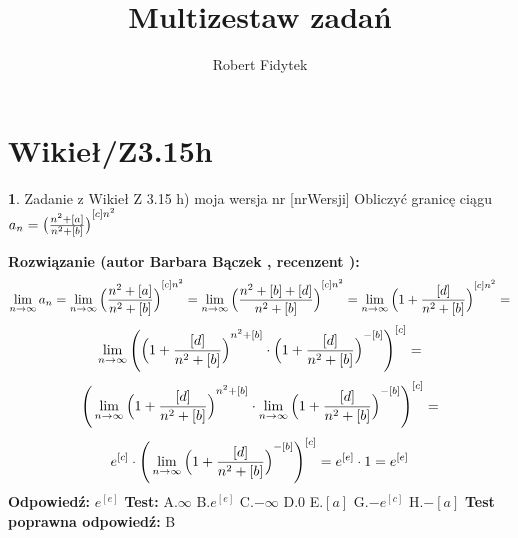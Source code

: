 \documentclass[12pt, a4paper]{article}
\title{Multizestaw zadań}
\author{Robert Fidytek}
\date{}
\theoremstyle{definition} %
\newtheorem{zad}{}
\newcommand{\kategoria}[1]{\section{#1}} %
\newcommand{\zadStart}[1]{\begin{zad}#1\newline} %
\newcommand{\zadStop}{\end{zad}}   %
\newcommand{\rozwStart}[2]{\noindent \textbf{Rozwiązanie (autor #1 , recenzent #2): }\newline} %
\newcommand{\rozwStop}{\newline}                                            %
\newcommand{\odpStart}{\noindent \textbf{Odpowiedź:}\newline}    %
\newcommand{\odpStop}{\newline}                                             %
\newcommand{\testStart}{\noindent \textbf{Test:}\newline} %
\newcommand{\testStop}{\newline} %
\newcommand{\kluczStart}{\noindent \textbf{Test poprawna odpowiedź:}\newline} %
\newcommand{\kluczStop}{\newline} %
\begin{document}
\maketitle


\kategoria{Wikieł/Z3.15h}
\zadStart{Zadanie z Wikieł Z 3.15 h) moja wersja nr [nrWersji]}
Obliczyć granicę ciągu $a_n= {\big{(} \frac{n^2+[a]}{n^2+[b]} \big{)}}^{[c]n^2}$
\zadStop
\rozwStart{Barbara Bączek}{}
$$\lim_{n \rightarrow \infty} a_n= \lim_{n \rightarrow \infty}  {\Big{(} \frac{n^2+[a]}{n^2+[b]} \Big{)}}^{[c]n^2}=\lim_{n \rightarrow \infty}  {\Big{(} \frac{n^2+[b]+[d]}{n^2+[b]} \Big{)}}^{[c]n^2}=\lim_{n \rightarrow \infty}  {\Big{(} 1+ \frac{[d]}{n^2+[b]} \Big{)}}^{[c]n^2}=$$
$$\lim_{n \rightarrow \infty} { \Bigg{(} {\Big{(} 1+ \frac{[d]}{n^2+[b]} \Big{)}}^{n^2+[b]} \cdot {\Big{(} 1+ \frac{[d]}{n^2+[b]} \Big{)}}^{-[b]} \Bigg{)}}^{[c]}=$$
$$ {\Bigg{(} \lim_{n \rightarrow \infty} {\Big{(} 1+ \frac{[d]}{n^2+[b]} \Big{)}}^{n^2+[b]} \cdot \lim_{n \rightarrow \infty} {\Big{(} 1+ \frac{[d]}{n^2+[b]} \Big{)}}^{-[b]} \Bigg{)}}^{[c]}=$$
$$ {e}^{[c]} \cdot { \Bigg{(} \lim_{n \rightarrow \infty} {\Big{(} 1+ \frac{[d]}{n^2+[b]} \Big{)}}^{-[b]} \Bigg{)}}^{[c]}= e^{[e]} \cdot 1= e^{[e]} $$
\rozwStop
\odpStart
$e^{[e]}$
\odpStop
\testStart
A.$\infty$
B.$e^{[e]}$
C.$-\infty$
D.$0$
E.$[a]$
G.$-e^{[c]}$
H.$-[a]$
\testStop
\kluczStart
B
\kluczStop
\end{document}
